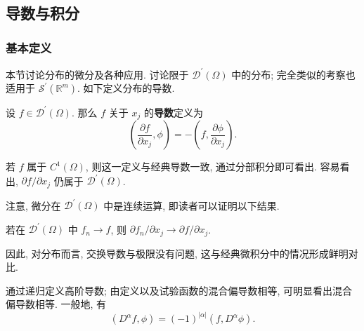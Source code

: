 \subsection{导数与积分}\label{sec:distribution-derivatives-integrals}

\subsubsection{基本定义}\label{subsec:distribution-derivative-basic-definitions}

本节讨论分布的微分及各种应用. 讨论限于 $\mathcal{D}^{\prime}(\Omega)$ 中的分布; 完全类似的考察也适用于 $\mathcal{S}^{\prime}(\mathbb{R}^m)$. 如下定义分布的导数.

\begin{Definition}
\label{def:distribution-partial-derivative}
设 $f\in\mathcal{D}^{\prime}(\Omega)$. 那么 $f$ 关于 $x_j$ 的\textbf{导数}定义为
\begin{equation}\label{eq:distribution-partial-derivative-definition}
\left(\dfrac{\partial f}{\partial x_j},\phi\right)=-\left(f,\dfrac{\partial\phi}{\partial x_j}\right).
\end{equation}

\end{Definition}

\begin{Remark}
\label{rem:distribution-classical-derivative-agreement}
若 $f$ 属于 $C^1(\Omega)$, 则这一定义与经典导数一致, 通过分部积分即可看出. 容易看出, $\partial f/\partial x_j$ 仍属于 $\mathcal{D}^{\prime}(\Omega)$.
\end{Remark}

注意, 微分在 $\mathcal{D}^{\prime}(\Omega)$ 中是连续运算, 即读者可以证明以下结果.

\begin{Theorem}
\label{thm:distribution-derivative-continuity}
若在 $\mathcal{D}^{\prime}(\Omega)$ 中 $f_n\to f$, 则 $\partial f_n/\partial x_j\to\partial f/\partial x_j$.
\end{Theorem}

因此, 对分布而言, 交换导数与极限没有问题, 这与经典微积分中的情况形成鲜明对比.

\begin{Remark}
\label{rem:distribution-higher-derivatives}
通过递归定义高阶导数; 由定义以及试验函数的混合偏导数相等, 可明显看出混合偏导数相等. 一般地, 有
\begin{equation}\label{eq:distribution-higher-derivative-pairing}
(D^\alpha f,\phi)=(-1)^{|\alpha|}(f,D^\alpha\phi).
\end{equation}

\end{Remark}

